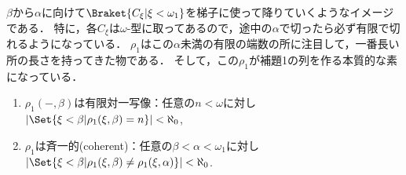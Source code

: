 \documentclass[a4j]{ltjsarticle}
\begin{document}
$\beta$から$\alpha$に向けて$\Braket{C_\xi | \xi < \omega_1}$を梯子に使って降りていくようなイメージである．
特に，各$C_\xi$は$\omega$-型に取ってあるので，途中の$\alpha$で切ったら必ず有限で切れるようになっている．
$\rho_1$はこの$\alpha$未満の有限の端数の所に注目して，一番長い所の長さを持ってきた物である．
そして，この$\rho_1$が補題1の列を作る本質的な素になっている．

\begin{lemma}
 \begin{enumerate}
  \item $\rho_1(-, \beta)$は有限対一写像：任意の$n < \omega$に対し$|\Set{\xi < \beta | \rho_1(\xi, \beta) = n}| < \aleph_0$,
  \item $\rho_1$は斉一的(coherent)：任意の$\beta < \alpha < \omega_1$に対し$|\Set{\xi < \beta | \rho_1(\xi, \beta) \neq \rho_1(\xi, \alpha)}| < \aleph_0$.
 \end{enumerate}
\end{lemma}
\end{document}
